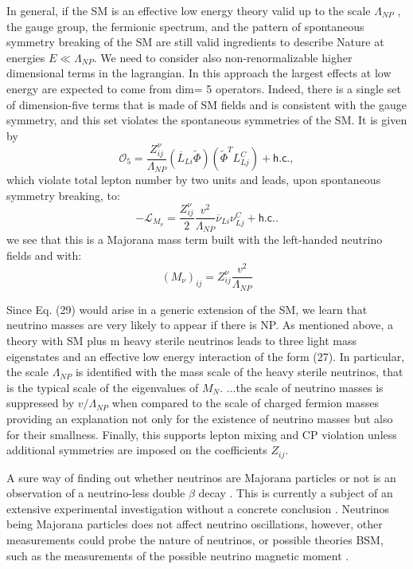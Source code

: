 \cite{Gonzalez-GarciaPhenomenologyMassiveNu.pdf} In general, if the SM is an effective low energy theory valid up to the scale $\Lambda_{NP}$ , the gauge group, the fermionic spectrum, and the pattern of spontaneous symmetry breaking of the SM are still valid ingredients to describe Nature at energies $E\ll \Lambda_{NP}$. We need to consider also non-renormalizable higher dimensional terms in the lagrangian. In this approach the largest effects at low energy are expected to come from dim= 5 operators.  Indeed, there is a single set of dimension-five terms that is made of SM fields and is consistent with the gauge symmetry, and this set violates the spontaneous symmetries of the SM. It is given by
\begin{equation}
\mathcal{O}_5=\frac{Z^\nu_{ij}}{\Lambda_{NP}}\left(\overline{L}_{Li}\tilde{\Phi}\right)\left(\tilde{\Phi}^T L_{Lj}^C\right)+\textsf{h.c.},
\end{equation}
which violate total lepton number by two units and leads, upon spontaneous symmetry breaking, to:
\begin{equation}
-\mathcal{L}_{M_\nu}=\frac{Z^\nu_{ij}}{2}\frac{v^2}{\Lambda_{NP}}\overline{\nu}_{Li}\nu_{Lj}^C+\textsf{h.c.}.
\end{equation}
 we see that this is a Majorana mass term built with
the left-handed neutrino fields and with:
\begin{equation}
\left(M_\nu\right)_{ij}=Z^{\nu}_{ij}\frac{v^2}{\Lambda_{NP}}
\end{equation}

\cite{Gonzalez-GarciaPhenomenologyMassiveNu.pdf} Since Eq. (29) would arise in a generic extension of the SM, we learn that neutrino masses are very likely to appear if there is NP. As mentioned above, a theory with SM plus m heavy sterile neutrinos leads to three light mass eigenstates and an effective low energy interaction of the form (27). In particular, the scale $\Lambda_{NP}$ is identified with the mass scale of the heavy sterile neutrinos, that is the typical scale of the eigenvalues of $M_N$. ...the scale of neutrino masses is suppressed by $v/\Lambda_{NP}$ when compared to the scale of charged fermion masses providing an explanation not only for the existence of neutrino masses but also for their smallness. Finally, this supports lepton mixing and CP violation unless additional symmetries are imposed on the coefficients $Z_{ij}$.
\fi

A sure way of finding out whether neutrinos are Majorana particles or not is an observation of a neutrino-less double $\beta$ decay \cite{Gonzalez-GarciaPhenomenologyMassiveNu.pdf}. This is currently a subject of an extensive experimental investigation without a concrete conclusion \cite{PDG.pdf}. Neutrinos being Majorana particles does not affect neutrino oscillations, however, other measurements could probe the nature of neutrinos, or possible theories \gls{BSM}, such as the measurements of the possible neutrino magnetic moment \cite{SnowmassNeutrinoFrontierReport.pdf}.

